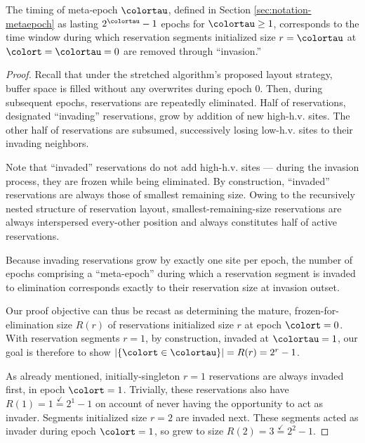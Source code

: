 \begin{lemma}
\label{thm:stretched-meta-epoch}

The timing of meta-epoch $\colortau$, defined in Section \ref{sec:notation-metaepoch} as lasting $2^{\colortau} - 1$ epochs for $\colortau\geq1$, corresponds to the time window during which reservation segments initialized size $r=\colortau$ at $\colort=\colortau=0$ are removed through ``invasion.''
\end{lemma}

\begin{proof}

Recall that under the stretched algorithm's proposed layout strategy, buffer space is filled without any overwrites during epoch 0.
Then, during subsequent epochs, reservations are repeatedly eliminated.
Half of reservations, designated ``invading'' reservations, grow by addition of new high-h.v. sites.
The other half of reservations are subsumed, successively losing low-h.v. sites to their invading neighbors.

Note that ``invaded'' reservations do not add high-h.v. sites --- during the invasion process, they are frozen while being eliminated.
By construction, ``invaded'' reservations are always those of smallest remaining size.
Owing to the recursively nested structure of reservation layout, smallest-remaining-size reservations are always interspersed every-other position and always constitutes half of active reservations.

Because invading reservations grow by exactly one site per epoch, the number of epochs comprising a ``meta-epoch'' during which a reservation segment is invaded to elimination corresponds exactly to their reservation size at invasion outset.

Our proof objective can thus be recast as determining the mature, frozen-for-elimination size $R(r)$ of reservations initialized size $r$ at epoch $\colort=0$.
With reservation segments $r=1$, by construction, invaded at $\colortau = 1$, our goal is therefore to show $|\{\colort \in \colortau\}| = R(r) = 2^{r} - 1$.

As already mentioned, initially-singleton $r=1$ reservations are always invaded first, in epoch $\colort=1$.
Trivially, these reservations also have $R(1) = 1 \stackrel{\checkmark}{=} 2^1 - 1$ on account of never having the opportunity to act as invader.
Segments initialized size $r=2$ are invaded next.
These segments acted as invader during epoch $\colort=1$, so grew to size $R(2) = 3 \stackrel{\checkmark}{=} 2^2 - 1$.


\end{proof}
